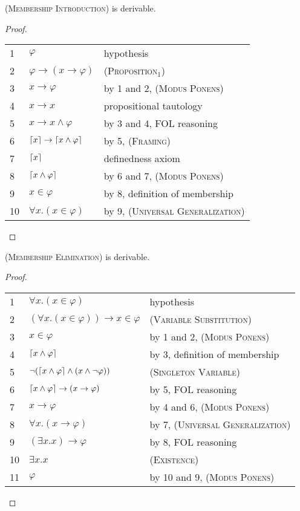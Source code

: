 \documentclass[acmsmall]{acmart}
\theoremstyle{acmdefinition}
\newcommand{\imp}{\to}
\newcommand{\prule}[1]{\textsc{(#1)}}
\newcommand{\modusponens}{\prule{Modus Ponens}\xspace}
\newcommand{\universalgeneralization}{\prule{Universal Generalization}\xspace}
\newcommand{\existence}{\prule{Existence}\xspace}
\newcommand{\singletonvariable}{\prule{Singleton Variable}\xspace}
\newcommand{\framing}{\prule{Framing}\xspace}
\newcommand{\membershipintroduction}{\prule{Membership Introduction}\xspace}
\newcommand{\membershipelimination}{\prule{Membership Elimination}\xspace}
\DeclarePairedDelimiter{\ceil}{\lceil}{\rceil}
\begin{document}
\begin{lemma}
\membershipintroduction is derivable.
\end{lemma}
\begin{proof}\quad
\begin{center}
\begin{tabular}{l|ll}
1 & $\varphi$ & hypothesis \\
2 & $\varphi \to (x \to \varphi)$ & \prule{Proposition$_1$} \\
3 & $x \imp \varphi$ 
  & by 1 and 2, \modusponens  \\
4 & $x \imp x$ & propositional tautology \\
5 & $x \imp x \wedge \varphi$ & by 3 and 4, FOL reasoning\\
6 & $\ceil{x} \to \ceil{x \wedge \varphi}$ 
  & by 5, \framing \\
7 & $\ceil{x}$ & definedness axiom \\
8 & $\ceil{x \wedge \varphi}$ & by 6 and 7, \modusponens \\
9 & $x \in \varphi$ & by 8, definition of membership \\
10& $\forall x . (x \in \varphi)$ & by 9, \universalgeneralization
\end{tabular}
\end{center}
\end{proof}

\begin{lemma}
\membershipelimination is derivable.
\end{lemma}
\begin{proof}\quad
\begin{center}
\begin{tabular}{l|ll}
1 & $\forall x . (x \in \varphi)$ & hypothesis \\
2 & $(\forall x . (x \in \varphi)) \imp x \in \varphi$ & \prule{Variable 
Substitution} \\
3 & $x \in \varphi$ & by 1 and 2, \modusponens \\
4 & $\ceil{x \wedge \varphi}$ & by 3, definition of membership \\
5 & $\neg (\ceil{x \wedge \varphi} \wedge (x \wedge \neg \varphi)) $
  & \singletonvariable \\
6 & $\ceil{x \wedge \varphi} \imp (x \imp \varphi)$
  & by 5, FOL reasoning \\
7 & $x \imp \varphi$ & by 4 and 6, \modusponens \\
8 & $\forall x . (x \imp \varphi)$ 
  & by 7, \universalgeneralization \\
9 & $(\exists x . x) \imp \varphi$ 
  & by 8, FOL reasoning\\
10& $\exists x . x$ & \existence \\
11& $\varphi$ & by 10 and 9, \modusponens 
\end{tabular}
\end{center}
\end{proof}
\end{document}
